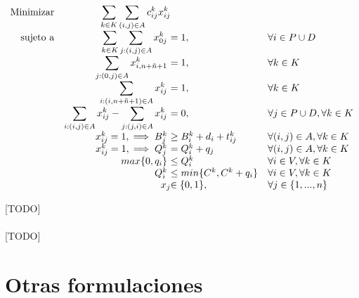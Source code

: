 \documentclass{subfiles}
\begin{document}
      \begin{eqfloat}
				\begin{equation}
					\begin{array}{rr@{}ll}
  					\text{Minimizar} & \displaystyle\sum\limits_{k \in K}\sum\limits_{(i, j) \in A}  c_{ij}^{k}x_{ij}^{k} &                 & \\
						\text{sujeto a}	 & \displaystyle\sum\limits_{k \in K}\sum\limits_{j: (i, j) \in A} x_{0j}^{k} \ &= 1,                      & \forall i \in P \cup D \\
                             & \displaystyle\sum\limits_{j: (0, j) \in A} x_{i,n+\tilde{n} + 1}^{k}  \ &= 1, 	                          & \forall k \in K \\
                             & \displaystyle\sum\limits_{i: (i, n + \tilde{n} + 1) \in A} x_{ij}^{k} \ &= 1, 	                          & \forall k \in K \\
                             & \displaystyle\sum\limits_{i: (i, j) \in A} x_{ij}^{k} - \sum\limits_{j: (j, i) \in A} x_{ij}^{k} \ &= 0, & \forall j \in P \cup D, \forall k \in K \\
                             & x_{ij}^{k} = 1, \implies B_{j}^{k} \ &\geq B_{i}^{k} + d_{i} + t_{ij}^{k} 	                          & \forall (i, j) \in A, \forall k \in K \\
                             & x_{ij}^{k} = 1, \implies Q_{j}^{k} \ &= Q_{i}^{k} + q_{j} 	                          & \forall (i, j) \in A, \forall k \in K \\
                             & max\{0, q_{i}\} \ &\leq Q_{i}^k 	                          & \forall i \in V, \forall k \in K \\
                             & Q_{i}^k \ &\leq min\{C^{k}, C^{k} + q_{i}\} 	                          & \forall i \in V, \forall k \in K \\
														 &                               	x_{j} 	&\in \{0,1\}, 	                 & \forall j \in \{1,...,n\} \\
					\end{array}
				\end{equation}
				\caption{[TODO]}
				\label{eq:basic_formulation}
			\end{eqfloat}

      \paragraph{}
      [TODO]

    \section{Otras formulaciones}
    \label{sec:formulation_other_formulations}
\end{document}
